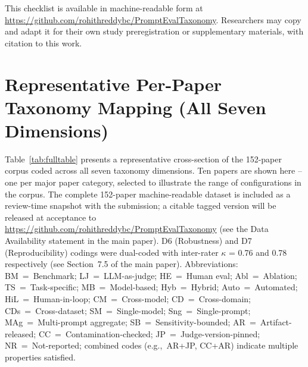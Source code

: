 \documentclass[acmsmall, nonacm, screen]{acmart}
\begin{document}
This checklist is available in machine-readable form at
\url{https://github.com/rohithreddybc/PromptEvalTaxonomy}.
Researchers may copy and adapt it for their own study
preregistration or supplementary materials, with citation to this
work.

\setcounter{table}{0}
\section{Representative Per-Paper Taxonomy Mapping (All Seven Dimensions)}
\label{app:fulltable}

Table~\ref{tab:fulltable} presents a representative cross-section of
the 152-paper corpus coded across all seven taxonomy dimensions. Ten
papers are shown here -- one per major paper category, selected to
illustrate the range of configurations in the corpus. The complete 152-paper machine-readable dataset is included as a
review-time snapshot with the submission; a citable tagged version
will be released at acceptance to
\url{https://github.com/rohithreddybc/PromptEvalTaxonomy}
(see the Data Availability statement in the main paper). D6 (Robustness) and D7 (Reproducibility) codings were
dual-coded with inter-rater $\kappa$ = 0.76 and 0.78 respectively
(see Section~7.5 of the main paper). Abbreviations: BM~=~Benchmark;
LJ~=~LLM-as-judge; HE~=~Human eval; Abl~=~Ablation;
TS~=~Task-specific; MB~=~Model-based; Hyb~=~Hybrid;
Auto~=~Automated; HiL~=~Human-in-loop; CM~=~Cross-model;
CD~=~Cross-domain; CDs~=~Cross-dataset; SM~=~Single-model;
Sng~=~Single-prompt; MAg~=~Multi-prompt aggregate;
SB~=~Sensitivity-bounded;
AR~=~Artifact-released; CC~=~Contamination-checked;
JP~=~Judge-version-pinned; NR~=~Not-reported;
combined codes (e.g.,~AR+JP, CC+AR) indicate multiple properties satisfied.
\end{document}
